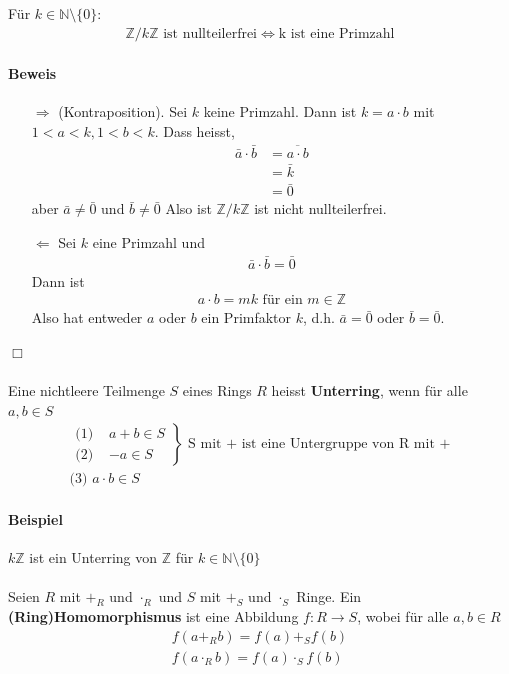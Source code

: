 \documentclass[11pt]{report}
\newcommand*\Zb[1] {\mathbb{#1}}
\newcommand*\f[1] {\textbf{#1}}
\begin{document}
\begin{lemma}
 \label{lemma231}
Für $k \in \Zb{N}\setminus\{0\}$:
\begin{align}
 \Zb{Z} / k\Zb{Z} \textrm{ ist nullteilerfrei} \Leftrightarrow \textrm{k ist eine Primzahl}
\end{align}
\end{lemma}
\paragraph{Beweis}
\begin{itemize}
\item[$\Rightarrow$] (Kontraposition). Sei $k$ keine Primzahl. Dann ist $k = a\cdot b$ mit $1 < a < k, 1<b<k$.
Dass heisst,
\begin{align}
 \bar{a}\cdot \bar{b} &= \overline{a\cdot b} \\
                      &= \bar{k} \\
                      &= \bar{0}
\end{align}
aber $\bar{a} \neq \bar{0}$ und $\bar{b} \neq \bar{0}$
Also ist $\Zb{Z}/k\Zb{Z}$ ist nicht nullteilerfrei.
\item[$\Leftarrow$] Sei $k$ eine Primzahl und 
\begin{align}
 \bar{a}\cdot \bar{b} = \bar{0}
\end{align}
Dann ist 
\begin{align}
 a\cdot b = mk \textrm{ für ein } m \in \Zb{Z}
\end{align}
Also hat entweder $a$ oder $b$ ein Primfaktor $k$, d.h. $\bar{a}=\bar{0}$ oder $\bar{b}=\bar{0}$.
\end{itemize}\hfill $\Box$ \\\\
Eine nichtleere Teilmenge $S$ eines Rings $R$ heisst \f{Unterring}, wenn für alle $a, b \in S$
\begin{align}
 \left. \begin{matrix} \text{(1) } &a +b \in S \\
 \text{(2) } &-a \in S \end{matrix} \right\} \text{ S mit + ist eine Untergruppe von R mit +} \\
 \text{(3) } a\cdot b \in S
\end{align}
\paragraph{Beispiel} $k\Zb{Z}$ ist ein Unterring von $\Zb{Z}$ für $k \in \Zb{N} \setminus\{0\}$\\\\
Seien $R$ mit $+_R$ und $\cdot_{R}$ und $S$ mit $+_S$ und $\cdot_{S}$ Ringe.
Ein \f{(Ring)Homomorphismus} ist eine Abbildung $f: R \rightarrow S$, wobei für alle $a, b \in R$
\begin{align}
 f(a +_R b) = f(a) +_S f(b) \\
 f(a \cdot_R b) = f(a) \cdot_S f(b) \\
\end{align}
\end{document}
